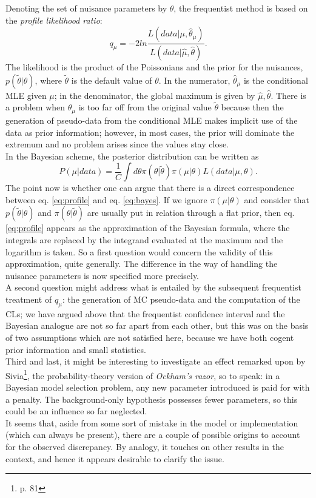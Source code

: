 \documentclass[aps,prb,twocolumn,showpacs,superscriptaddress,groupedaddress]{revtex4}  %
\begin{document}
Denoting the set of nuisance parameters by $\theta$, the frequentist method is based on the \emph{profile likelihood ratio}\cite{procedure, CMSthesis}:
\begin{equation}\label{eq:profile}
q_{\mu}=-2 ln \frac{L(data|\mu,\hat{\theta}_{\mu})}{L(data|\hat{\mu},\hat{\theta})}.
\end{equation}
The likelihood is the product of the Poissonians and the prior for the nuisances, $p(\tilde{\theta}|\theta)$, where $\tilde{\theta}$ is the default value of $\theta$. In the numerator, $\hat{\theta}_{\mu}$ is the conditional MLE given $\mu$; in the denominator, the global maximum is given by $\hat{\mu},\hat{\theta}$. There is a problem when $\hat{\theta}_{\mu}$ is too far off from the original value $\tilde{\theta}$ because then the generation of pseudo-data from the conditional MLE makes implicit use of the data as prior information; however, in most cases, the prior will dominate the extremum and no problem arises since the values stay close.\\
In the Bayesian scheme, the posterior distribution can be written as
\begin{equation}\label{eq:bayes}
P(\mu|data)=\frac{1}{C}\int d\theta \pi(\theta|\tilde{\theta})\pi(\mu|\theta)L(data|\mu,\theta).
\end{equation}
The point now is whether one can argue that there is a direct correspondence between eq. \ref{eq:profile} and eq. \ref{eq:bayes}. If we ignore $\pi(\mu|\theta)$ and consider that $p(\tilde{\theta}|\theta)$ and $\pi(\theta|\tilde{\theta})$ are usually put in relation through a flat prior, then eq. \ref{eq:profile} appears as the approximation of the Bayesian formula, where the integrals are replaced by the integrand evaluated at the maximum and the logarithm is taken. So a first question would concern the validity of this approximation, quite generally. The difference in the way of handling the nuisance parameters is now specified more precisely.\\
A second question might address what is entailed by the subsequent frequentist treatment of $q_{\mu}$: the generation of MC pseudo-data and the computation of the CLs; we have argued above that the frequentist confidence interval and the Bayesian analogue are not so far apart from each other, but this was on the basis of two assumptions which are not satisfied here, because we have both cogent prior information and small statistics.\\
Third and last, it might be interesting to investigate an effect remarked upon by Sivia\footnote{p. 81}, the probability-theory version of \emph{Ockham's razor}, so to speak: in a Bayesian model selection problem, any new parameter introduced is paid for with a penalty. The background-only hypothesis possesses fewer parameters, so this could be an influence so far neglected.\\
It seems that, aside from some sort of mistake in the model or implementation (which can always be present), there are a couple of possible origins to account for the observed discrepancy. By analogy, it touches on other results in the context, and hence it appears desirable to clarify the issue. 
%
%
\end{document}
